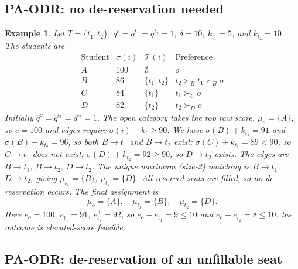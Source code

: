 \documentclass[10pt]{article}
\newtheorem{example}{Example}
\newcommand{\T}{\mathcal{T}}
\newcommand{\1}{\mathbf{1}}
\begin{document}
\subsection{PA-ODR: no de-reservation needed}

\begin{example}
Let $T=\{t_1,t_2\}$, $q^o=q^{t_1}=q^{t_2}=1$, $\delta=10$, $k_{t_1}=5$, and $k_{t_2}=10$. The students are
\[
\begin{array}{c|c|c|c}
\text{Student} & \sigma(i) & \T(i) & \text{Preference} \\
\hline
A & 100 & \emptyset & o \\
B & 86  & \{t_1,t_2\} & t_2\succ_B t_1\succ_B o \\
C & 84  & \{t_1\} & t_1\succ_C o \\
D & 82  & \{t_2\} & t_2\succ_D o
\end{array}
\]
Initially $\hat q^o=\hat q^{t_1}=\hat q^{t_2}=1$. The open category takes the top raw score, $\mu_o=\{A\}$, so $e=100$ and edges require $\sigma(i)+k_t\ge 90$. We have $\sigma(B)+k_{t_1}=91$ and $\sigma(B)+k_{t_2}=96$, so both $B\to t_1$ and $B\to t_2$ exist; $\sigma(C)+k_{t_1}=89<90$, so $C\to t_1$ does not exist; $\sigma(D)+k_{t_2}=92\ge 90$, so $D\to t_2$ exists. The edges are $B\to t_1$, $B\to t_2$, $D\to t_2$. The unique maximum (size-2) matching is $B\to t_1$, $D\to t_2$, giving $\mu_{t_1}=\{B\}$, $\mu_{t_2}=\{D\}$. All reserved seats are filled, so no de-reservation occurs. The final assignment is
\[
\mu_o=\{A\},\quad \mu_{t_1}=\{B\},\quad \mu_{t_2}=\{D\}.
\]
Here $e_o=100$, $e_{t_1}^+=91$, $e_{t_2}^+=92$, so $e_o-e_{t_1}^+=9\le 10$ and $e_o-e_{t_2}^+=8\le 10$: the outcome is elevated-score feasible.
\end{example}

\subsection{PA-ODR: de-reservation of an unfillable seat}
\end{document}
